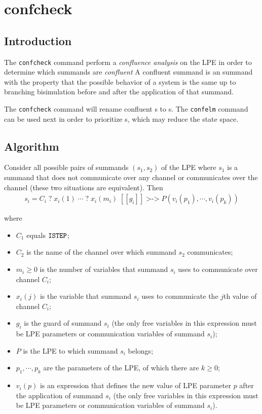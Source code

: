 \chapter{confcheck} \label{confcheck}

\section{Introduction}

The \texttt{confcheck} command perform a \emph{confluence analysis} on the LPE in order to determine which \istep{} summands are \emph{confluent}
A confluent \istep{} summand is an \istep{} summand with the property that the possible behavior of a system is the same up to branching bisimulation before and after the application of that summand.

The \texttt{confcheck} command will rename confluent \istep{}s to \cistep{}s.
The \texttt{confelm} command can be used next in order to prioritize \cistep{}s, which may reduce the state space.

\section{Algorithm}

Consider all possible pairs of summands $(s_1, s_2)$ of the LPE where $s_1$ is a summand that does not communicate over any channel or communicates over the channel \istep{} (these two situations are equivalent).
Then
\begin{align*}
s_i = C_i \; \texttt{?} \; x_i(1) \; \cdots{} \; \texttt{?} \; x_i(m_i) \; [[g_i]] \; \texttt{>->} \; P(v_i(p_1), \cdots{}, v_i(p_k))
\end{align*}

where

\begin{itemize}
\item $C_1$ equals $\texttt{ISTEP}{}$;
\item $C_2$ is the name of the channel over which summand $s_2$ communicates;
\item $m_i \geq 0$ is the number of variables that summand $s_i$ uses to communicate over channel $C_i$;
\item $x_i(j)$ is the variable that summand $s_i$ uses to communicate the $j$th value of channel $C_i$;
\item $g_i$ is the guard of summand $s_i$ (the only free variables in this expression must be LPE parameters or communication variables of summand $s_i$);
\item $P$ is the LPE to which summand $s_i$ belongs;
\item $p_1, \cdots{}, p_k$ are the parameters of the LPE, of which there are $k \geq 0$;
\item $v_i(p)$ is an expression that defines the new value of LPE parameter $p$ after the application of summand $s_i$ (the only free variables in this expression must be LPE parameters or communication variables of summand $s_i$).
\end{itemize}

